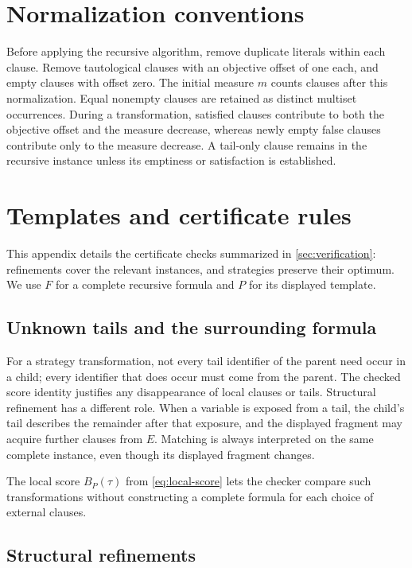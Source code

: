 \documentclass[11pt]{article}
\theoremstyle{definition}
\theoremstyle{remark}
\begin{document}
\clearpage
\appendix
\section{Normalization conventions}
\label{app:normalization}

Before applying the recursive algorithm, remove duplicate literals within
each clause. Remove tautological clauses with an objective offset of one
each, and empty clauses with offset zero. The initial measure $m$ counts
clauses after this normalization. Equal nonempty clauses are retained as
distinct multiset occurrences. During a transformation, satisfied clauses
contribute to both the objective offset and the measure decrease, whereas
newly empty false clauses contribute only to the measure decrease. A
tail-only clause remains in the recursive instance unless its emptiness or
satisfaction is established.

\section{Templates and certificate rules}
\label{sec:certificate}

This appendix details the certificate checks summarized in
\cref{sec:verification}: refinements cover the relevant
instances, and strategies preserve their optimum. We use $F$ for a complete
recursive formula and $P$ for its displayed template.

\subsection{Unknown tails and the surrounding formula}

For a strategy transformation, not every tail identifier of the parent need
occur in a child; every identifier that does occur must come from the parent.
The checked score identity justifies any disappearance of local clauses or
tails. Structural refinement has a different role. When a variable is exposed
from a tail, the child's tail describes the remainder after that exposure, and
the displayed fragment may acquire further clauses from $E$. Matching is
always interpreted on the same complete instance, even though its displayed
fragment changes.

The local score $B_P(\tau)$ from \cref{eq:local-score} lets the checker compare
such transformations without constructing a complete formula for each choice
of external clauses.

\subsection{Structural refinements}
\label{sec:refinements}
\end{document}
